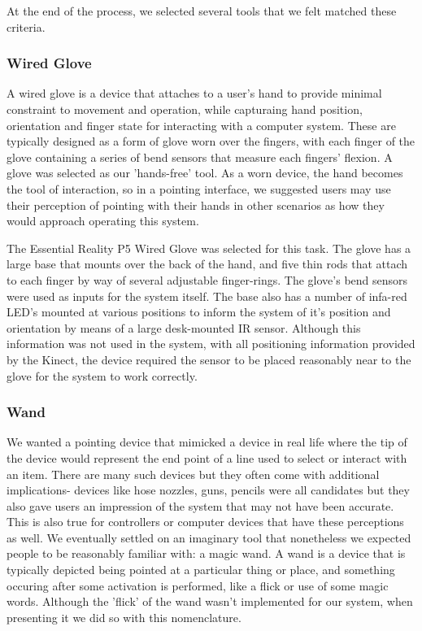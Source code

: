 At the end of the process, we selected several tools that we felt matched these criteria.

\subsubsection{Wired Glove}

A wired glove is a device that attaches to a user's hand to provide minimal constraint to movement and operation, while capturaing hand position, orientation and finger state for interacting with a computer system. These are typically designed as a form of glove worn over the fingers, with each finger of the glove containing a series of bend sensors that measure each fingers' flexion. A glove was selected as our 'hands-free' tool. As a worn device, the hand becomes the tool of interaction, so in a pointing interface, we suggested users may use their perception of pointing with their hands in other scenarios as how they would approach operating this system.

The Essential Reality P5 Wired Glove was selected for this task. The glove has a large base that mounts over the back of the hand, and five thin rods that attach to each finger by way of several adjustable finger-rings. The glove's bend sensors were used as inputs for the system itself. The base also has a number of infa-red LED's mounted at various positions to inform the system of it's position and orientation by means of a large desk-mounted IR sensor. Although this information was not used in the system, with all positioning information provided by the Kinect, the device required the sensor to be placed reasonably near to the glove for the system to work correctly.

\subsubsection{Wand}

We wanted a pointing device that mimicked a device in real life where the tip of the device would represent the end point of a line used to select or interact with an item. There are many such devices but they often come with additional implications- devices like hose nozzles, guns, pencils were all candidates but they also gave users an impression of the system that may not have been accurate. This is also true for controllers or computer devices that have these perceptions as well. We eventually settled on an imaginary tool that nonetheless we expected people to be reasonably familiar with: a magic wand. A wand is a device that is typically depicted being pointed at a particular thing or place, and something occuring after some activation is performed, like a flick or use of some magic words. Although the 'flick' of the wand wasn't implemented for our system, when presenting it we did so with this nomenclature.

